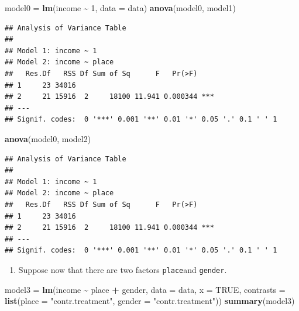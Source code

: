 \documentclass[
]{article}
\newenvironment{Shaded}{\begin{snugshade}}{\end{snugshade}}
\newcommand{\AttributeTok}[1]{\textcolor[rgb]{0.13,0.29,0.53}{#1}}
\newcommand{\ConstantTok}[1]{\textcolor[rgb]{0.56,0.35,0.01}{#1}}
\newcommand{\DecValTok}[1]{\textcolor[rgb]{0.00,0.00,0.81}{#1}}
\newcommand{\FunctionTok}[1]{\textcolor[rgb]{0.13,0.29,0.53}{\textbf{#1}}}
\newcommand{\NormalTok}[1]{#1}
\newcommand{\OtherTok}[1]{\textcolor[rgb]{0.56,0.35,0.01}{#1}}
\newcommand{\SpecialCharTok}[1]{\textcolor[rgb]{0.81,0.36,0.00}{\textbf{#1}}}
\newcommand{\StringTok}[1]{\textcolor[rgb]{0.31,0.60,0.02}{#1}}
\providecommand{\tightlist}{%
  \setlength{\itemsep}{0pt}\setlength{\parskip}{0pt}}
\begin{document}
\begin{Shaded}
\begin{Highlighting}[]
\NormalTok{model0 }\OtherTok{=} \FunctionTok{lm}\NormalTok{(income }\SpecialCharTok{\textasciitilde{}} \DecValTok{1}\NormalTok{, }\AttributeTok{data =}\NormalTok{ data)}
\FunctionTok{anova}\NormalTok{(model0, model1)}
\end{Highlighting}
\end{Shaded}

\begin{verbatim}
## Analysis of Variance Table
## 
## Model 1: income ~ 1
## Model 2: income ~ place
##   Res.Df   RSS Df Sum of Sq      F   Pr(>F)    
## 1     23 34016                                 
## 2     21 15916  2     18100 11.941 0.000344 ***
## ---
## Signif. codes:  0 '***' 0.001 '**' 0.01 '*' 0.05 '.' 0.1 ' ' 1
\end{verbatim}

\begin{Shaded}
\begin{Highlighting}[]
\FunctionTok{anova}\NormalTok{(model0, model2)}
\end{Highlighting}
\end{Shaded}

\begin{verbatim}
## Analysis of Variance Table
## 
## Model 1: income ~ 1
## Model 2: income ~ place
##   Res.Df   RSS Df Sum of Sq      F   Pr(>F)    
## 1     23 34016                                 
## 2     21 15916  2     18100 11.941 0.000344 ***
## ---
## Signif. codes:  0 '***' 0.001 '**' 0.01 '*' 0.05 '.' 0.1 ' ' 1
\end{verbatim}

\begin{enumerate}
\def\labelenumi{\arabic{enumi}.}
\setcounter{enumi}{4}
\tightlist
\item
  Suppose now that there are two factors \texttt{place}and
  \texttt{gender}.
\end{enumerate}

\begin{Shaded}
\begin{Highlighting}[]
\NormalTok{model3 }\OtherTok{=} \FunctionTok{lm}\NormalTok{(income }\SpecialCharTok{\textasciitilde{}}\NormalTok{ place }\SpecialCharTok{+}\NormalTok{ gender, }\AttributeTok{data =}\NormalTok{ data, }\AttributeTok{x =} \ConstantTok{TRUE}\NormalTok{, }\AttributeTok{contrasts =} \FunctionTok{list}\NormalTok{(}\AttributeTok{place =} \StringTok{"contr.treatment"}\NormalTok{,}
    \AttributeTok{gender =} \StringTok{"contr.treatment"}\NormalTok{))}
\FunctionTok{summary}\NormalTok{(model3)}
\end{Highlighting}
\end{Shaded}
\end{document}
